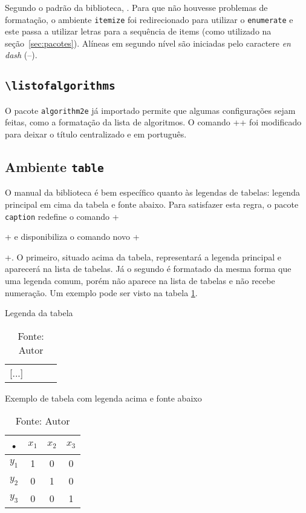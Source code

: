 \documentclass[xindy,draft]{fei}
\begin{document}
    Segundo o padrão da biblioteca, . Para que não houvesse problemas de formatação, o ambiente \texttt{itemize} foi redirecionado para utilizar o \texttt{enumerate} e este passa a utilizar letras para a sequência de items (como utilizado na seção~\ref{sec:pacotes}). Alíneas em segundo nível são iniciadas pelo caractere \emph{en dash} (--).
    
    \subsection{\texttt{\textbackslash listofalgorithms}}
    
    O pacote \texttt{algorithm2e} já importado permite que algumas configurações sejam feitas, como a formatação da lista de algoritmos. O comando \latexinline+\listofalgorithms+ foi modificado para deixar o título centralizado e em português.
    
    \subsection{Ambiente \texttt{table}}

	O manual da biblioteca é bem específico quanto às legendas de tabelas: legenda principal em cima da tabela e fonte abaixo. Para satisfazer esta regra, o pacote \texttt{caption} redefine o comando \latexinline+\caption{}+ e disponibiliza o comando novo \latexinline+\caption*{}+. O primeiro, situado acima da tabela, representará a legenda principal e aparecerá na lista de tabelas. Já o segundo é formatado da mesma forma que uma legenda comum, porém não aparece na lista de tabelas e não recebe numeração. Um exemplo pode ser visto na tabela \ref{tbl:exemplo}.

\begin{latexcode}
\begin{table}[ht!]
	\caption{Legenda da tabela}
	\begin{tabular}{|c|c|c|c|}
		[...]
	\end{tabular}
	\caption*{Fonte: Autor}
\end{table}
\end{latexcode}

\begin{table}[ht!]
    \caption{Exemplo de tabela com legenda acima e fonte abaixo} \label{tbl:exemplo}
    \centering
    \begin{tabular}{|c|c|c|c|}
    \hline 
    • & \(x_1\) & \(x_2\) & \(x_3\) \\ 
    \hline 
    \(y_1\) & 1 & 0 & 0 \\ 
    \hline 
    \(y_2\) & 0 & 1 & 0 \\ 
    \hline 
    \(y_3\) & 0 & 0 & 1 \\ 
    \hline 
    \end{tabular}
    \caption*{Fonte: Autor}
\end{table}
\end{document}
